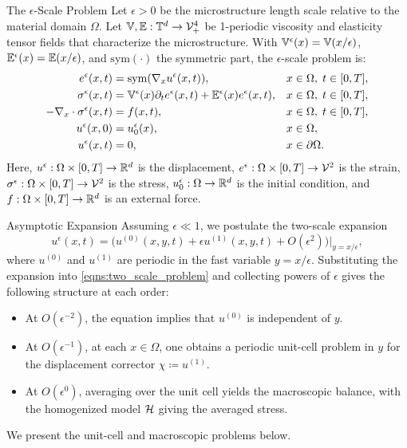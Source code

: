 \documentclass[3p, 12pt, preprint]{elsarticle}
\begin{document}
\begin{namedparagraph}{The $\epsilon$-Scale Problem}
Let $\epsilon>0$ be the microstructure length scale relative to the material domain $\Omega$. Let $\mathbb{V}, \mathbb{E}:\mathbb{T}^d\to{\mathcal{V}}^4_{+}$ be 1-periodic viscosity and elasticity tensor fields that characterize the microstructure. With $\mathbb{V}^{\epsilon}(x) = \mathbb{V}(x/\epsilon)$, $\mathbb{E}^{\epsilon}(x) = \mathbb{E}(x/\epsilon)$, and $\mathrm{sym}(\cdot)$ the symmetric part, the $\epsilon$-scale problem is:
\begin{subequations}\label{eqns:two_scale_problem}
\begin{align}
    e^{\epsilon}(x,t) &=\mathrm{sym}(\nabla_x u^{\epsilon}(x,t)),&& x \in \Omega, \; t \in [0,T], \label{eq:two_scale_strain}\\
    \sigma^{\epsilon}(x, t) &= \mathbb{V}^{\epsilon}(x) \partial_t{e}^{\epsilon}(x, t) + \mathbb{E}^{\epsilon}(x)e^{\epsilon}(x,t), && x \in \Omega, \; t \in [0,T], \label{eq:two_scale_stress}\\
    -\nabla_x \cdot \sigma^{\epsilon}(x,t) &=  f(x,t) ,&& x \in \Omega, \; t \in [0,T], \label{eq:two_scale_balance}\\
    u^{\epsilon}(x, 0) & = u^{\epsilon}_0(x), && x\in\Omega, \\
    u^{\epsilon}(x, t) & = 0, && x\in\partial\Omega.
\end{align}
\end{subequations}
Here, $u^{\epsilon}:\Omega\times[0,T]\to\mathbb{R}^d$ is the displacement, $e^{\epsilon}:\Omega\times[0,T]\to{\mathcal{V}}^2$ is the strain, $\sigma^{\epsilon}:\Omega\times[0,T]\to{\mathcal{V}}^2$ is the stress, $u^{\epsilon}_0:\Omega\to\mathbb{R}^d$ is the initial condition, and $f:\Omega\times[0,T]\to\mathbb{R}^d$ is an external force.
\end{namedparagraph}

\begin{namedparagraph}{Asymptotic Expansion}
Assuming $\epsilon\ll 1$, we postulate the two-scale expansion \cite{bensoussan1978asymptotic,sanchezpalencia1980nonhomogeneous}
\begin{equation*}
    u^{\epsilon}(x,t)= \bigl(u^{(0)}(x,y,t) + \epsilon u^{(1)}(x,y,t) + O(\epsilon^2)\bigr) \Big |_{y=x/\epsilon},
\end{equation*}
where $u^{(0)}$ and $u^{(1)}$ are periodic in the fast variable $y=x/\epsilon$. Substituting the expansion into \cref{eqns:two_scale_problem} and collecting powers of $\epsilon$ gives the following structure at each order:
\begin{itemize}
    \item At $O(\epsilon^{-2})$, the equation implies that $u^{(0)}$ is independent of $y$.
    \item At $O(\epsilon^{-1})$, at each $x\in\Omega$, one obtains a periodic unit-cell problem in $y$ for the displacement corrector $\chi\coloneqq u^{(1)}$.
    \item At $O(\epsilon^{0})$, averaging over the unit cell yields the macroscopic balance, with the homogenized model ${\mathcal{H}}$ giving the averaged stress.
\end{itemize}
We present the unit-cell and macroscopic problems below.
\end{namedparagraph}
\end{document}
